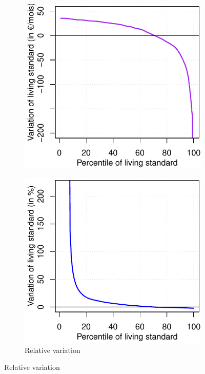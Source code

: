\documentclass[a5paper,english,openany]{memoir}
\begin{document}
\begin{figure}[h!]
\begin{subfigure}{.5\textwidth}
  \includegraphics[width=\textwidth]{../figures/policies/gcp_diff_rev_en.pdf}
\end{subfigure}
\quad \quad
\begin{subfigure}{.5\textwidth}
  \caption[]{Relative variation}\label{fig:evol_distr_c}
  \includegraphics[width=\textwidth]{../figures/policies/gcp_var_rev_en.pdf}

\end{subfigure}
\end{figure}
\end{document}
